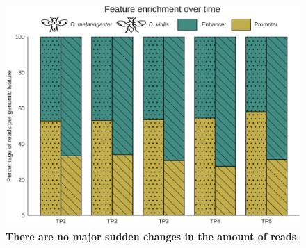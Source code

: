 \begin{figure}[H]
    \includegraphics[width=\linewidth]{ch.hourglass/images/feature_enrichment.png}
    \caption{\textbf{There are no major sudden changes in the amount of reads}.}
    \label{fig:peak_enrichment}
\end{figure}

\closesupplement
